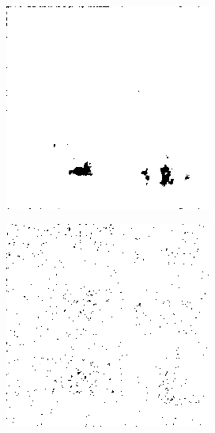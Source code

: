 \begin{figure}[H]
\begin{minipage}[t]{0.245\textwidth}
    \label{fig:noise_20_6}
    \includegraphics[width = \textwidth]{result/noisy/1_20_0.png}
    \label{fig:noise_20_0}
\end{minipage}
\begin{minipage}[t]{0.245\textwidth}
    \includegraphics[width = \textwidth]{result/noisy/1_30_20.png}

\end{minipage}
\end{figure}

